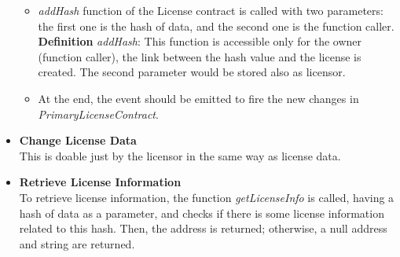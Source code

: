 \begin{itemize}
\begin{itemize}
		\item \textit{addHash} function of the License contract is called with two parameters: the first one is the hash of data, and the second one is the function caller.\\
		\hspace{1cm} \textbf{Definition} \textit{addHash}: This function is accessible only for the owner (function caller), the link between the hash value and the license is created. The second parameter would be stored also as licensor. \\
		\item At the end, the event should be emitted to fire the new changes in \textit{PrimaryLicenseContract}.
		
	\end{itemize}
	\item \textbf{Change License Data} \\
	This is doable just by the licensor in the same way as license data. \\
	\item \textbf{Retrieve License Information} \\
	To retrieve license information, the function \textit{getLicenseInfo} is called, having a hash of data as a parameter, and checks if there is some license information related to this hash. Then, the address is returned; otherwise, a null address and string are returned.
	
\end{itemize}

